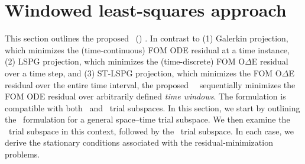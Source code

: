 \section{Windowed least-squares approach}\label{sec:tclspg} 
This section
outlines the proposed \methodNameLower\ 
(\methodAcronym) \approachKwd. In contrast to (1) Galerkin projection, 
which minimizes the (time-continuous) FOM ODE residual at a time instance, 
(2) LSPG projection, 
which minimizes
the (time-discrete) FOM O$\Delta$E residual 
over a time step, and (3) ST-LSPG projection, 
which minimizes
the  FOM O$\Delta$E residual 
over the entire time interval, the proposed \methodAcronym\ \approachKwd\ sequentially minimizes the 
FOM ODE residual over arbitrarily defined
\textit{time windows}. The formulation is compatible with both \spatialAcronym\ and \spaceTimeAcronym\ trial subspaces. 
In this section, we start by outlining the \methodAcronym\ formulation  
for a general space--time trial subspace. We then examine the \spatialAcronym\ 
trial subspace in this context, followed by the \spaceTimeAcronym\ trial subspace. In each case, we derive the stationary conditions 
associated with the residual-minimization problems.

%
